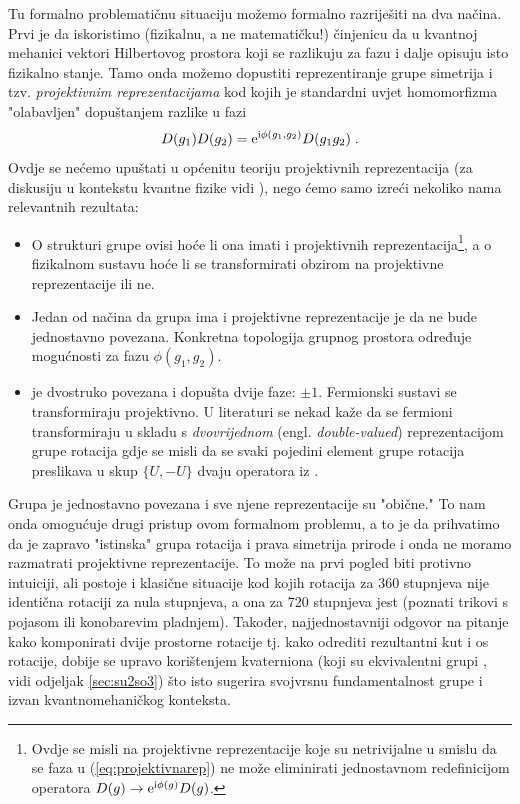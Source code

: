 Tu formalno problematičnu situaciju možemo formalno razriješiti na dva
načina. Prvi je da iskoristimo (fizikalnu, a ne matematičku!)
činjenicu da u kvantnoj mehanici vektori Hilbertovog prostora koji
se razlikuju za fazu i dalje opisuju isto fizikalno stanje.
Tamo onda možemo dopustiti reprezentiranje grupe simetrija i tzv.
\emph{projektivnim reprezentacijama} kod kojih je standardni
uvjet homomorfizma "olabavljen" dopuštanjem razlike u fazi
  
\begin{equation}
   D(g_1)D(g_2)=\textrm{e}^{\textrm{i} \phi(g_1,g_2)}D(g_1 g_2) \;.
   \label{eq:projektivnarep}
\end{equation}
Ovdje se nećemo upuštati u općenitu teoriju projektivnih reprezentacija 
(za diskusiju u kontekstu kvantne fizike vidi \cite{Weinberg:1995mt}),
nego ćemo samo izreći nekoliko nama relevantnih rezultata:

\begin{itemize}
    \item O strukturi grupe ovisi hoće li ona imati i projektivnih 
        reprezentacija\footnote{Ovdje se misli na projektivne reprezentacije
        koje su netrivijalne u smislu da se faza u (\ref{eq:projektivnarep})
        ne može eliminirati jednostavnom redefinicijom operatora $D(g) \to
        \textrm{e}^{\textrm{i}\phi(g)}D(g)$.}, a o fizikalnom sustavu hoće li se transformirati 
        obzirom na projektivne reprezentacije ili ne.

    \item  Jedan od načina da grupa ima i projektivne reprezentacije je da
           ne bude jednostavno povezana. Konkretna topologija grupnog prostora
           određuje mogućnosti za fazu $\phi(g_1,g_2)$.

    \item {} je dvostruko povezana i dopušta dvije faze: $\pm 1$. Fermionski
          sustavi se transformiraju projektivno. U literaturi se nekad kaže
          da se fermioni transformiraju u skladu s \emph{dvovrijednom} (engl.
          \emph{double-valued}) reprezentacijom grupe rotacija gdje se misli
          da se svaki pojedini element grupe rotacija preslikava
          u skup $\{U, -U\}$ dvaju operatora iz .
\end{itemize}

Grupa  je jednostavno povezana i sve njene reprezentacije su "obične."
To nam onda omogućuje drugi pristup ovom formalnom problemu, a to je da
prihvatimo da je zapravo  "istinska" grupa rotacija i prava simetrija prirode
i onda ne moramo razmatrati projektivne reprezentacije.
To može na prvi pogled biti protivno intuiciji, ali postoje i klasične
situacije kod kojih rotacija za 360 stupnjeva nije identična
rotaciji za nula stupnjeva, a ona za 720 stupnjeva jest (poznati trikovi
s pojasom ili konobarevim pladnjem). Također, najjednostavniji odgovor na
pitanje kako komponirati dvije prostorne rotacije tj. kako odrediti
rezultantni kut i os rotacije, dobije se upravo korištenjem
kvaterniona (koji su ekvivalentni grupi , vidi odjeljak \ref{sec:su2so3})
što isto sugerira svojvrsnu
fundamentalnost grupe  i izvan kvantnomehaničkog konteksta.

